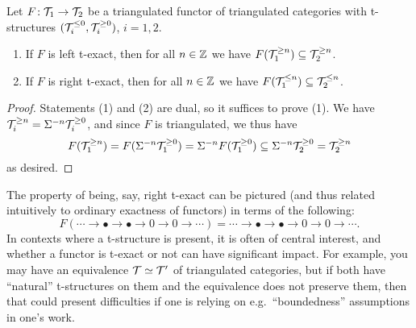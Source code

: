 \begin{lemma}
	Let \(F\!:\mathcal{T}_1 \to \mathcal{T}_2\) be a triangulated functor of triangulated categories with t-structures \((\mathcal{T}^{\leq 0}_i,\mathcal{T}^{\geq 0}_i)\), \(i=1,2\).
	\begin{enumerate}[label=(\arabic*)]
		\item If \(F\) is left t-exact, then for all \(n\in\mathbb{Z}\) we have \(F(\mathcal{T}^{\geq n}_1) \subseteq \mathcal{T}^{\geq n}_2\).
		\item If \(F\) is right t-exact, then for all \(n\in\mathbb{Z}\) we have \(F(\mathcal{T}^{\leq n}_1) \subseteq \mathcal{T}^{\leq n}_2\).
	\end{enumerate}
\end{lemma}
\begin{proof}
Statements (1) and (2) are dual, so it suffices to prove (1). We have \(\mathcal{T}^{\geq n}_i = \Sigma^{-n}\mathcal{T}^{\geq 0}_i\), and since \(F\) is triangulated, we thus have
\[ F(\mathcal{T}^{\geq n}_1) = F(\Sigma^{-n}\mathcal{T}^{\geq 0}_1) = \Sigma^{-n}F(\mathcal{T}^{\geq 0}_1) \subseteq \Sigma^{-n}\mathcal{T}^{\geq 0}_2 = \mathcal{T}^{\geq n}_2 \]
as desired.
\end{proof}

\begin{remark}
	The property of being, say, right t-exact can be pictured (and thus related intuitively to ordinary exactness of functors) in terms of the following:
	\[ F(\cdots \to \bullet \to \bullet \to 0\to 0 \to\cdots) = \cdots \to \bullet \to \bullet \to 0\to 0 \to\cdots. \]
	In contexts where a t-structure is present, it is often of central interest, and whether a functor is t-exact or not can have significant impact. For example,
	you may have an equivalence \(\mathcal{T} \simeq \mathcal{T}'\) of triangulated categories, but if both have ``natural'' t-structures on them and the equivalence does not preserve them, then
	that could present difficulties if one is relying on e.g.\ ``boundedness'' assumptions in one's work.
\end{remark}

